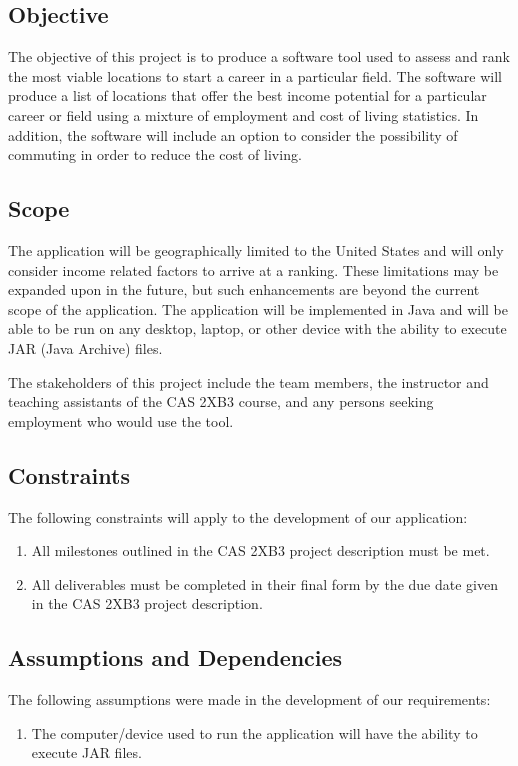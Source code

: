 \documentclass[english]{article}
\begin{document}
\subsection{Objective}
The objective of this project is to produce a software tool used to assess and rank the most viable locations to start a career in a particular field. The software will produce a list of locations that offer the best income potential for a particular career or field using a mixture of employment and cost of living statistics. In addition, the software will include an option to consider the possibility of commuting in order to reduce the cost of living.

\color{black}
\subsection{Scope}
\label{sub:scope}
The application will be geographically limited to the United States and will only consider income related factors to arrive at a ranking.  These limitations may be expanded upon in the future, but such enhancements are beyond the current scope of the application. The application will be implemented in Java and will be able to be run on any desktop, laptop, or other device with the ability to execute JAR (Java Archive) files.
\newline

The stakeholders of this project include the team members, the instructor and teaching assistants of the CAS 2XB3 course, and any persons seeking employment who would use the tool.



\subsection{Constraints}
\label{sub:constraints}
The following constraints will apply to the development of our application:
\begin{enumerate}
	\item All milestones outlined in the CAS 2XB3 project description must be met.
	\item All deliverables must be completed in their final form by the due date given in the CAS 2XB3 project description.
\end{enumerate}

\subsection{Assumptions and Dependencies}
\label{sub:assumptions_and_dependencies}
The following assumptions were made in the development of our requirements:
\begin{enumerate}
	\item The computer/device used to run the application will have the ability to execute JAR files.
\end{enumerate}
\end{document}
